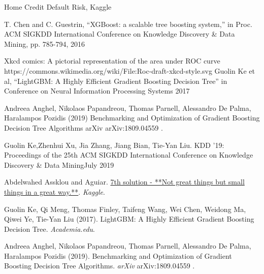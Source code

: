\documentclass[sigconf, nonacm]{acmart}
\begin{document}
\begin{thebibliography}{99}

 Home Credit Default Risk, Kaggle

	T. Chen and C. Guestrin, “XGBoost: a scalable tree boosting system,” in Proc. ACM SIGKDD International Conference on Knowledge Discovery & Data Mining, pp. 785-794, 2016

	Xkcd comics: A pictorial representation of the area under ROC curve https://commons.wikimedia.org/wiki/File:Roc-draft-xkcd-style.svg
	Guolin Ke et al, “LightGBM: A Highly Efficient Gradient Boosting Decision Tree” in Conference on Neural Information Processing Systems 2017


Andreea Anghel, Nikolaos Papandreou, Thomas Parnell, Alessandro De Palma, Haralampos Pozidis (2019) Benchmarking and Optimization of Gradient Boosting Decision Tree
Algorithms arXiv arXiv:1809.04559 .

 Guolin Ke,Zhenhui Xu, Jia Zhang, Jiang Bian, Tie-Yan Liu. KDD '19: Proceedings of the 25th ACM SIGKDD International Conference on Knowledge Discovery & Data MiningJuly 2019

 Abdelwahed Assklou and Aguiar. \href{https://www.kaggle.com/c/home-credit-default-risk/discussion/64580}{7th solution - **Not great things but small things in a great way.**}. {\em Kaggle}.

 Guolin Ke, Qi Meng, Thomas Finley, Taifeng Wang, Wei Chen, Weidong Ma, Qiwei Ye, Tie-Yan Liu (2017). LightGBM: A Highly Efficient Gradient Boosting Decision Tree. {\em Academia.edu}.


 Andreea Anghel, Nikolaos Papandreou, Thomas Parnell, Alessandro De Palma, Haralampos Pozidis (2019). Benchmarking and Optimization of Gradient Boosting Decision Tree Algorithms. {\em arXiv} 	arXiv:1809.04559 .



\end{thebibliography}

%
%
\end{document}
